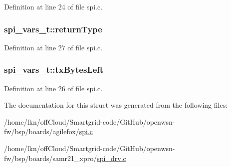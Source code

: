 Definition at line 24 of file spi.\+c.

\subsubsection[{\texorpdfstring{return\+Type}{returnType}}]{ spi\+\_\+vars\+\_\+t\+::return\+Type}\hypertarget{structspi__vars__t_a6b580459aa36aa4af18405db898ae22c}{}\label{structspi__vars__t_a6b580459aa36aa4af18405db898ae22c}


Definition at line 27 of file spi.\+c.

\subsubsection[{\texorpdfstring{tx\+Bytes\+Left}{txBytesLeft}}]{ spi\+\_\+vars\+\_\+t\+::tx\+Bytes\+Left}\hypertarget{structspi__vars__t_a99b47617d35243eb2ad6322a694acc28}{}\label{structspi__vars__t_a99b47617d35243eb2ad6322a694acc28}


Definition at line 26 of file spi.\+c.



The documentation for this struct was generated from the following files\+:\begin{DoxyCompactItemize}
\item 
/home/lkn/off\+Cloud/\+Smartgrid-\/code/\+Git\+Hub/openwsn-\/fw/bsp/boards/agilefox/\hyperlink{agilefox_2spi_8c}{spi.\+c}\item 
/home/lkn/off\+Cloud/\+Smartgrid-\/code/\+Git\+Hub/openwsn-\/fw/bsp/boards/samr21\+\_\+xpro/\hyperlink{spi__drv_8c}{spi\+\_\+drv.\+c}\end{DoxyCompactItemize}
